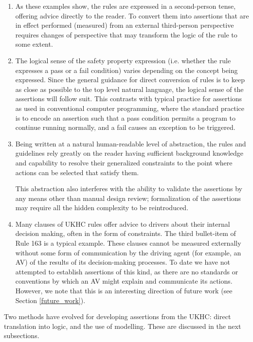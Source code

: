 \begin{enumerate}
    \item As these examples show, the rules are expressed in a second-person tense, offering advice directly to the reader. To convert them into assertions that are in effect performed (measured) from an external third-person perspective requires changes of perspective that may transform the logic of the rule to some extent.
    \item The logical sense of the safety property expression (i.e. whether the rule expresses a pass or a fail condition) varies depending on the concept being expressed. Since the general guidance for direct conversion of rules is to keep as close as possible to the top level natural language, the logical sense of the assertions will follow suit. This contrasts with typical practice for assertions as used in conventional computer programming, where the standard practice is to encode an assertion such that a pass condition permits a program to continue running normally, and a fail causes an exception to be triggered.
    \item Being written at a natural human-readable level of abstraction, the rules and guidelines rely greatly on the reader having sufficient background knowledge and capability to resolve their generalized constraints to the point where actions can be selected that satisfy them.
    
    This abstraction also interferes with the ability to validate the assertions by any means other than manual design review; formalization of the assertions may require all the hidden complexity to be reintroduced.
    \item Many clauses of UKHC rules offer advice to drivers about their internal decision making, often in the form of constraints. The third bullet-item of Rule 163 is a typical example. These clauses cannot be measured externally without some form of communication by the driving agent (for example, an AV) of the results of its decision-making processes. To date we have not attempted to establish assertions of this kind, as there are no standards or conventions by which an AV might explain and communicate its actions. However, we note that this is an interesting direction of future work (see Section \ref{future_work}). 
\end{enumerate}

Two methods have evolved for developing assertions from the UKHC: direct translation into logic, and the use of modelling. These are discussed in the next subsections.

